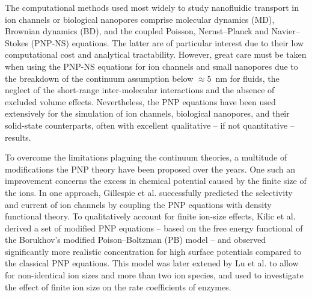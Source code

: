 \documentclass[journal=ancac3,manuscript=article,etalmode=truncate,maxauthors=0,layout=twocolumn]{achemso}
\begin{document}
The computational methods used most widely to study nanofluidic transport in ion channels or biological
nanopores comprise molecular dynamics (MD),\cite{Lynden-Bell-1996,Allen-1999,Aksimentiev-2005,Luan-2008,
Bhattacharya-2011,Zhang-2014,DiMarino-2015,Belkin-2016} Brownian dynamics (BD),\cite{Schirmer-1999,Im-2002,
Noskov-2004,Millar-2008,Egwolf-2010,DeBiase-2015,Pederson-2015} and the coupled Poisson, Nernst--Planck and
Navier--Stokes (PNP-NS) equations\cite{Simakov-2010,Pederson-2015,Hsu-2017b,Gillespie-2002}. The latter are of
particular interest due to their low computational cost and  analytical tractability. However, great care must
be taken when using the PNP-NS equations for ion channels and small nanopores due to the breakdown of the
continuum assumption below $\approx5$~nm for fluids, the neglect of the short-range inter-molecular
interactions and the absence of excluded volume effects.\cite{Corry-2000,Collins-2012} Nevertheless, the PNP
equations have been used extensively for the simulation of ion channels,\cite{Im-2002,Furini-2006,Liu-2015}
biological nanopores,\cite{Simakov-2010,Pederson-2015} and their solid-state counterparts,\cite{Cervera-2005,
White-2008,Chaudhry-2014,Laohakunakorn-2015} often with excellent qualitative -- if not quantitative --
results.\cite{Maffeo-2012,Thomas-2014,Kim-2015}

To overcome the limitations plaguing the continuum theories, a multitude of modifications the PNP theory have
been proposed over the years.\cite{Bazant-2009,Daiguji-2010} One such an improvement concerns the excess in
chemical potential caused by the finite size of the ions.\cite{Eisenberg-1996} In one approach, Gillespie et
al. successfully predicted the selectivity and current of ion channels by coupling the PNP equations with
density functional theory.\cite{Gillespie-2002} To qualitatively account for finite ion-size effects, Kilic et
al. derived a set of modified PNP equations\cite{Kilic-2007} -- based on the free energy functional of the
Borukhov's modified Poison--Boltzman (PB) model\cite{Borukhov-1997} -- and observed significantly more
realistic concentration for high surface potentials compared to the classical PNP equations. This model was
later extened by Lu et al. to allow for non-identical ion sizes and more than two ion species, and used to
investigate the effect of finite ion size on the rate coefficients of enzymes.\cite{Lu-2011}
\end{document}
